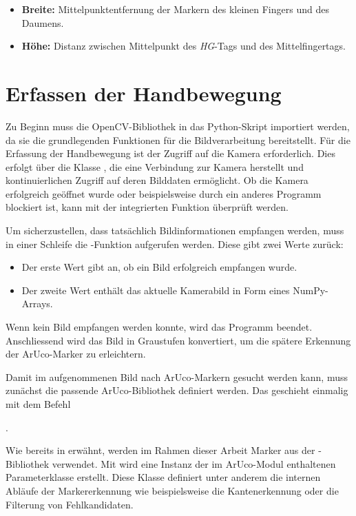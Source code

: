 \begin{itemize}
    \item \textbf{Breite:} Mittelpunktentfernung der Markern des kleinen Fingers und des Daumens.
    \item \textbf{Höhe:} Distanz zwischen Mittelpunkt des \textit{HG}-Tags und des Mittelfingertags.
\end{itemize}

\section{Erfassen der Handbewegung}
Zu Beginn muss die OpenCV-Bibliothek in das Python-Skript importiert werden, da sie die grundlegenden Funktionen für die Bildverarbeitung bereitstellt.
Für die Erfassung der Handbewegung ist der Zugriff auf die Kamera erforderlich.
Dies erfolgt über die Klasse , die eine Verbindung zur Kamera herstellt und kontinuierlichen Zugriff auf deren Bilddaten ermöglicht.
Ob die Kamera erfolgreich geöffnet wurde oder beispielsweise durch ein anderes Programm blockiert ist, kann mit der integrierten Funktion  überprüft werden.

Um sicherzustellen, dass tatsächlich Bildinformationen empfangen werden, muss in einer Schleife die -Funktion aufgerufen werden.
Diese gibt zwei Werte zurück:

\begin{itemize}
    \item Der erste Wert gibt an, ob ein Bild erfolgreich empfangen wurde\footnotemark{}.
    \item Der zweite Wert enthält das aktuelle Kamerabild in Form eines NumPy-Arrays\footnotemark{}.
\end{itemize}

Wenn kein Bild empfangen werden konnte, wird das Programm beendet.
Anschliessend wird das Bild in Graustufen konvertiert, um die spätere Erkennung der ArUco-Marker zu erleichtern.

Damit im aufgenommenen Bild nach ArUco-Markern gesucht werden kann, muss zunächst die passende ArUco-Bibliothek definiert werden.
Das geschieht einmalig mit dem Befehl

.

Wie bereits in  erwähnt, werden im Rahmen dieser Arbeit Marker aus der -Bibliothek verwendet.
Mit  wird eine Instanz der im ArUco-Modul enthaltenen Parameterklasse erstellt.
Diese Klasse definiert unter anderem die internen Abläufe der Markererkennung wie beispielsweise die Kantenerkennung oder die Filterung von Fehlkandidaten.

